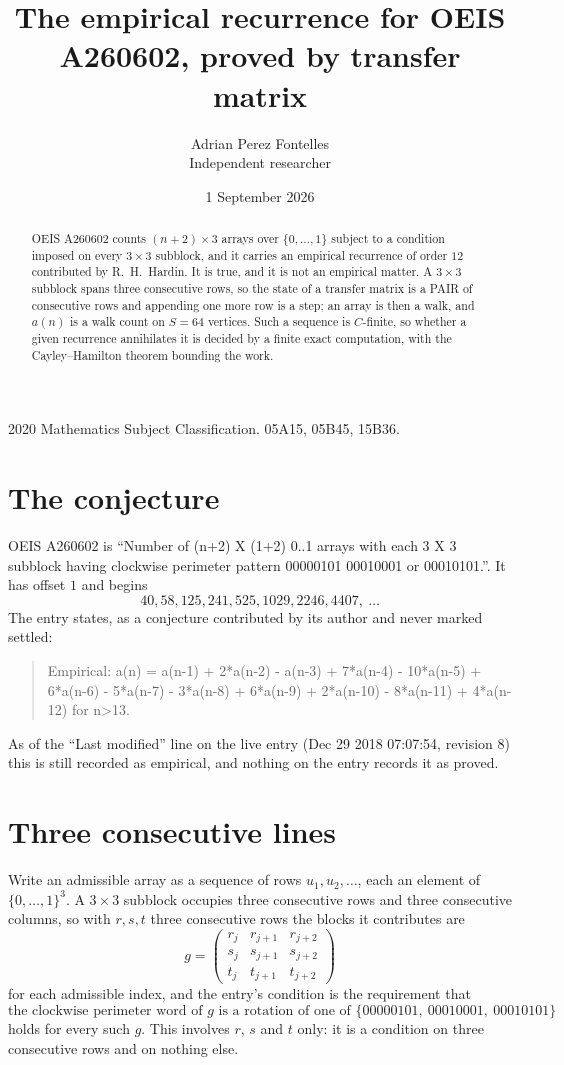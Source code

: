 \documentclass[11pt,a4paper]{article}
\title{The empirical recurrence for OEIS A260602, proved by transfer matrix}
\author{Adrian Perez Fontelles\\ \small Independent researcher}
\date{1 September 2026}
\theoremstyle{plain}
\theoremstyle{definition}
\begin{document}
\maketitle

\begin{abstract}
OEIS A260602 counts $(n+2)\times3$ arrays over $\{0,\dots,1\}$ subject to a condition imposed on
every $3\times3$ subblock, and it carries an empirical recurrence of order $12$
contributed by R.~H.~Hardin. It is true, and it is not an empirical matter. A $3\times3$
subblock spans three consecutive rows, so the state of a transfer matrix is a PAIR of
consecutive rows and appending one more row is a step; an array is then a walk, and
$a(n)$ is a walk count on $S=64$ vertices. Such a sequence is $C$-finite, so whether a given
recurrence annihilates it is decided by a finite exact computation, with the Cayley--Hamilton
theorem bounding the work.
\end{abstract}

\noindent\small 2020 Mathematics Subject Classification. 05A15, 05B45, 15B36.\normalsize

\section{The conjecture}

OEIS A260602 is ``Number of (n+2) X (1+2) 0..1 arrays with each 3 X 3 subblock having clockwise perimeter pattern 00000101 00010001 or 00010101.''. It has offset $1$ and begins
\[
40, 58, 125, 241, 525, 1029, 2246, 4407,\ \dots
\]
The entry states, as a conjecture contributed by its author and never marked settled:
\begin{quote}
Empirical: a(n) = a(n-1) + 2*a(n-2) - a(n-3) + 7*a(n-4) - 10*a(n-5) + 6*a(n-6) - 5*a(n-7) - 3*a(n-8) + 6*a(n-9) + 2*a(n-10) - 8*a(n-11) + 4*a(n-12) for n>13.
\end{quote}
As of the ``Last modified'' line on the live entry (Dec 29 2018 07:07:54, revision 8) this is still
recorded as empirical, and nothing on the entry records it as proved.

\section{Three consecutive lines}

Write an admissible array as a sequence of rows $u_1,u_2,\dots$, each an element of
$\{0,\dots,1\}^{3}$. A $3\times3$ subblock occupies three consecutive rows and
three consecutive columns, so with $r,s,t$ three consecutive rows the blocks it
contributes are
\[
g=\begin{pmatrix}r_j&r_{j+1}&r_{j+2}\\ s_j&s_{j+1}&s_{j+2}\\ t_j&t_{j+1}&t_{j+2}\end{pmatrix}
\]
for each admissible index, and the entry's condition is the requirement that
\[
\text{the clockwise perimeter word of }g\text{ is a rotation of one of }\{00000101,\ 00010001,\ 00010101\}
\]
holds for every such $g$. This involves $r$, $s$ and $t$ only: it is a condition on
three consecutive rows and on nothing else.
\end{document}
